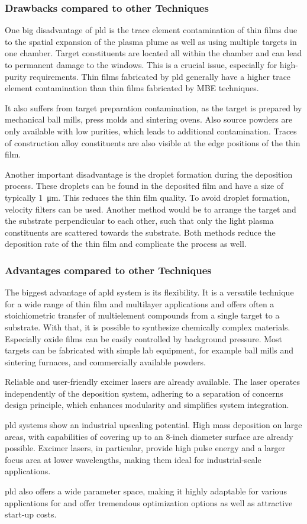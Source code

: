 \subsubsection{Drawbacks compared to other Techniques}
One big disadvantage of \ac{pld} is the trace element contamination of thin films due
to the spatial expansion of the plasma plume as well as using multiple targets in
one chamber.
Target constituents are located all within the chamber and can lead to permanent damage 
to the windows.
This is a crucial issue, especially for high-purity requirements.
Thin films fabricated by \ac{pld} generally have a higher trace element contamination 
than thin films fabricated by MBE techniques.

It also suffers from target preparation contamination, as the target is prepared by
mechanical ball mills, press molds and sintering ovens.
Also source powders are only available with low purities, which leads to additional 
contamination. 
Traces of construction alloy constituents are also visible at the edge positions of the
thin film. 

Another important disadvantage is the droplet formation during the deposition process.
These droplets can be found in the deposited film and have a size of typically
\qty{1}{\micro \meter}.
This reduces the thin film quality. 
To avoid droplet formation, velocity filters can be used.
Another method would be to arrange the target and the substrate perpendicular to each 
other, such that only the light plasma constituents are scattered towards the substrate.
Both methods reduce the deposition rate of the thin film and complicate the process 
as well.

\subsubsection{Advantages compared to other Techniques}
The biggest advantage of a\ac{pld} system is its flexibility. 
It is a versatile technique for a wide range of thin film and multilayer applications
and offers often a stoichiometric transfer of multielement compounds from a single 
target to a substrate.
With that, it is possible to synthesize chemically complex materials. 
Especially oxide films can be easily controlled by background pressure. 
Most targets can be fabricated with simple lab equipment, for example ball mills and 
sintering furnaces, and commercially available powders.

Reliable and user-friendly excimer lasers are already available. 
The laser operates independently of the deposition system, adhering to a separation 
of concerns design principle, which enhances modularity and simplifies system 
integration.

\ac{pld} systems show an industrial upscaling potential. 
High mass deposition on large areas, with capabilities of covering up to an 8-inch 
diameter surface are already possible. 
Excimer lasers, in particular, provide high pulse energy and a larger focus area at 
lower wavelengths, making them ideal for industrial-scale applications.

\ac{pld} also offers a wide parameter space, making it highly adaptable for various 
applications for and offer tremendous optimization options as well as attractive 
start-up costs.